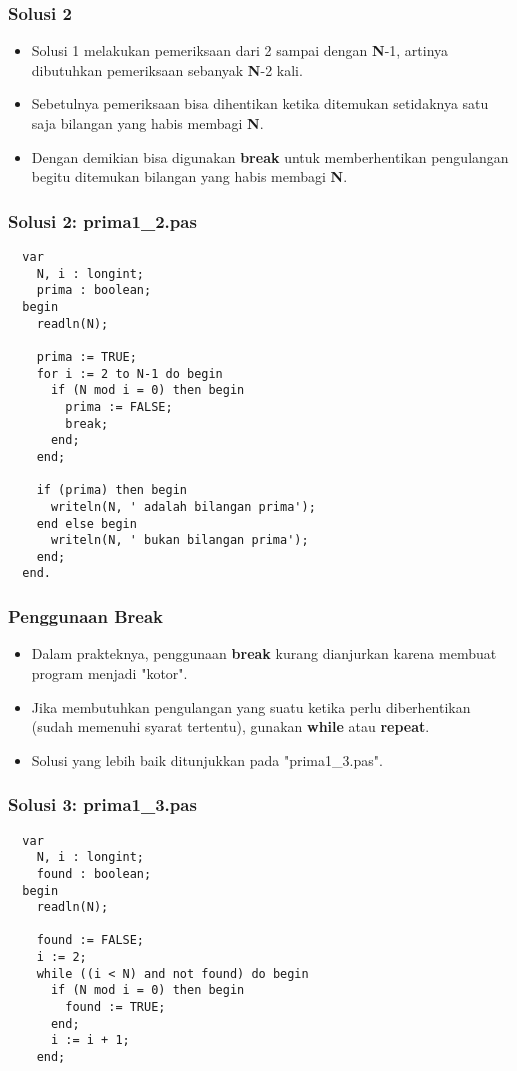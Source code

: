 \begin{frame}
\frametitle{Solusi 2}
\begin{itemize}
  \item Solusi 1 melakukan pemeriksaan dari 2 sampai dengan \textbf{N}-1, artinya dibutuhkan pemeriksaan sebanyak \textbf{N}-2 kali.
  \item Sebetulnya pemeriksaan bisa dihentikan ketika ditemukan setidaknya satu saja bilangan yang habis membagi \textbf{N}.
  \item Dengan demikian bisa digunakan \textbf{break} untuk memberhentikan pengulangan begitu ditemukan bilangan yang habis membagi \textbf{N}.
\end{itemize}
\end{frame}

\begin{frame}[fragile]
\frametitle{Solusi 2: prima1\_2.pas}
\begin{lstlisting}
  var
    N, i : longint;
    prima : boolean;
  begin
    readln(N);

    prima := TRUE;
    for i := 2 to N-1 do begin
      if (N mod i = 0) then begin
        prima := FALSE;
        break;
      end;
    end;

    if (prima) then begin
      writeln(N, ' adalah bilangan prima');
    end else begin
      writeln(N, ' bukan bilangan prima');
    end;
  end.
\end{lstlisting}
\end{frame}

\begin{frame}
\frametitle{Penggunaan Break}
\begin{itemize}
  \item Dalam prakteknya, penggunaan \textbf{break} kurang dianjurkan karena membuat program menjadi "kotor".
  \item Jika membutuhkan pengulangan yang suatu ketika perlu diberhentikan (sudah memenuhi syarat tertentu), gunakan \textbf{while} atau \textbf{repeat}.
  \item Solusi yang lebih baik ditunjukkan pada "prima1\_3.pas".
\end{itemize}
\end{frame}

\begin{frame}[fragile]
\frametitle{Solusi 3: prima1\_3.pas}
\begin{lstlisting}
  var
    N, i : longint;
    found : boolean;
  begin
    readln(N);

    found := FALSE;
    i := 2;
    while ((i < N) and not found) do begin
      if (N mod i = 0) then begin
        found := TRUE;
      end;
      i := i + 1;
    end;
\end{lstlisting}
\end{frame}


